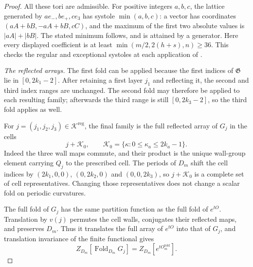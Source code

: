\begin{proof}
All these tori are admissible. For positive integers $a,b,c$,
the lattice generated by $ae_-,be_+,ce_3$ has systole
$\min(a,b,c)$: a vector has coordinates $(aA+bB,-aA+bB,cC)$,
and the maximum of the first two absolute values is
$|aA|+|bB|$. The stated minimum follows, and is attained by a
generator. Here every displayed coefficient is at least
$\min(m/2,2(h+s),n)\ge36$. This checks the regular and exceptional
systoles at each application of .

\emph{The reflected arrays.}
The first fold can be applied because the first indices of
$\mathfrak G$ lie in $[0,2k_1-2]$. After retaining a first layer
$j_1$ and reflecting it, the second and third index ranges are
unchanged. The second fold may therefore be applied to each
resulting family; afterwards the third range is still
$[0,2k_3-2]$, so the third fold applies as well.

For $j=(j_1,j_2,j_3)\in\mathcal K^{\mathrm{reg}}$, the final
family is the full reflected array of $G_j$ in the cells
\[
 j+\mathcal K_0,\qquad
 \mathcal K_0=\{\kappa:0\le\kappa_a\le2k_a-1\}.
\]
Indeed the three wall maps commute, and their product is the
unique wall-group element carrying $Q_j$ to the prescribed cell.
The periods of $D_m$ shift the cell indices by
$(2k_1,0,0)$, $(0,2k_2,0)$ and $(0,0,2k_3)$, so
$j+\mathcal K_0$ is a complete set of cell representatives.
Changing those representatives does not change a scalar fold on
periodic curvatures.

The full fold of $G_j$ has the same partition function as the full
fold of $e^{tO}$. Translation by $v(j)$ permutes the cell walls,
conjugates their reflected maps, and preserves $D_m$. Thus it
translates the full array of $e^{tO}$ into that of $G_j$, and
translation invariance of the finite functional gives
\[
 Z_{D_m}[\operatorname{Fold}_{D_m}G_j]
       =Z_{D_m}[e^{tO_m^{\mathrm{fold}}}].
\]


\end{proof}
